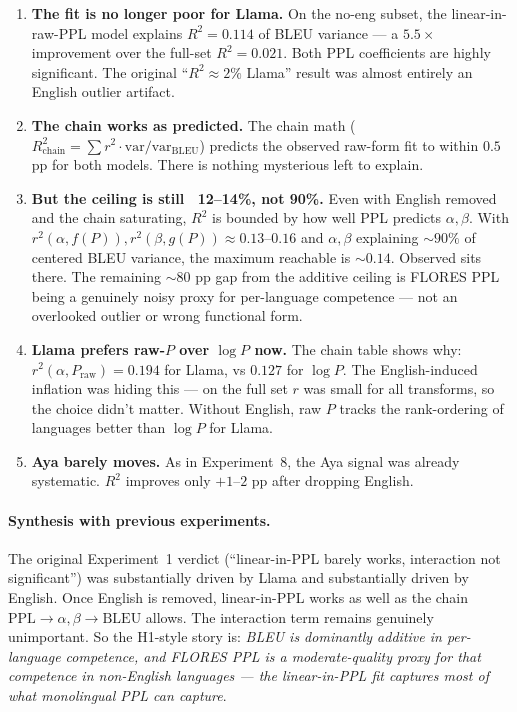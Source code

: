 \documentclass[11pt]{article}
\begin{document}
\begin{enumerate}
  \item \textbf{The fit is no longer poor for Llama.} On the no-eng
    subset, the linear-in-raw-PPL model explains $R^2 = 0.114$ of BLEU
    variance --- a $5.5\times$ improvement over the full-set $R^2 = 0.021$.
    Both PPL coefficients are highly significant. The original
    ``$R^2 \approx 2\%$ Llama'' result was almost entirely an English
    outlier artifact.
  \item \textbf{The chain works as predicted.} The chain math
    ($R^2_{\text{chain}} = \sum r^2 \cdot \mathrm{var}/\mathrm{var}_{\text{BLEU}}$)
    predicts the observed raw-form fit to within $0.5$ pp for both
    models. There is nothing mysterious left to explain.
  \item \textbf{But the ceiling is still ~12--14\%, not 90\%.} Even with
    English removed and the chain saturating, $R^2$ is bounded by how well
    PPL predicts $\alpha, \beta$. With $r^2(\alpha, f(P)), r^2(\beta, g(P))
    \approx 0.13$--$0.16$ and $\alpha, \beta$ explaining $\sim 90\%$ of
    centered BLEU variance, the maximum reachable is
    $\sim 0.14$. Observed sits there. The remaining
    $\sim\!80$ pp gap from the additive ceiling is FLORES PPL being a
    genuinely noisy proxy for per-language competence --- not an
    overlooked outlier or wrong functional form.
  \item \textbf{Llama prefers raw-$P$ over $\log P$ now.} The chain
    table shows why: $r^2(\alpha, P_{\text{raw}}) = 0.194$ for Llama, vs
    $0.127$ for $\log P$. The English-induced inflation was hiding this
    --- on the full set $r$ was small for all transforms, so the choice
    didn't matter. Without English, raw $P$ tracks the rank-ordering of
    languages better than $\log P$ for Llama.
  \item \textbf{Aya barely moves.} As in Experiment~8, the Aya signal was
    already systematic. $R^2$ improves only $+1$--$2$ pp after dropping
    English.
\end{enumerate}

\paragraph{Synthesis with previous experiments.} The original Experiment~1
verdict (``linear-in-PPL barely works, interaction not significant'') was
substantially driven by Llama and substantially driven by English. Once
English is removed, linear-in-PPL works as well as the chain
$\text{PPL} \to \alpha, \beta \to \text{BLEU}$ allows. The interaction
term remains genuinely unimportant. So the H1-style story is:
\emph{BLEU is dominantly additive in per-language competence, and FLORES
PPL is a moderate-quality proxy for that competence in non-English
languages --- the linear-in-PPL fit captures most of what monolingual
PPL can capture}.
\end{document}
